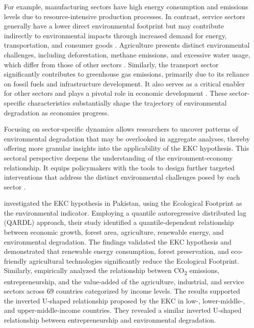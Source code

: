 \documentclass[10pt]{article}
\begin{document}
For example, manufacturing sectors have high energy consumption and emissions levels due to resource-intensive production processes. In contrast, service sectors generally have a lower direct environmental footprint but may contribute indirectly to environmental impacts through increased demand for energy, transportation, and consumer goods \citep{Madlberger2024}. Agriculture presents distinct environmental challenges, including deforestation, methane emissions, and excessive water usage, which differ from those of other sectors \citep{omotosoInterplayAgricultureGreenhouse2024}. Similarly, the transport sector significantly contributes to greenhouse gas emissions, primarily due to its reliance on fossil fuels and infrastructure development. It also serves as a critical enabler for other sectors and plays a pivotal role in economic development \citep{shafiqueInvestigatingNexusTransport2021}. These sector-specific characteristics substantially shape the trajectory of environmental degradation as economies progress.

Focusing on sector-specific dynamics allows researchers to uncover patterns of environmental degradation that may be overlooked in aggregate analyses, thereby offering more granular insights into the applicability of the EKC hypothesis. This sectoral perspective deepens the understanding of the environment-economy relationship. It equips policymakers with the tools to design further targeted interventions that address the distinct environmental challenges posed by each sector \citep{sectoralEKCandpolicy}.

\cite{azizRevisitingRoleForestry2020} investigated the EKC hypothesis in Pakistan, using the Ecological Footprint as the environmental indicator. Employing a quantile autoregressive distributed lag (QARDL) approach, their study identified a quantile-dependent relationship between economic growth, forest area, agriculture, renewable energy, and environmental degradation. The findings validated the EKC hypothesis and demonstrated that renewable energy consumption, forest preservation, and eco-friendly agricultural technologies significantly reduce the Ecological Footprint. Similarly, \cite{omriEntrepreneurshipSectoralOutputs2018} empirically analyzed the relationship between CO\textsubscript{2} emissions, entrepreneurship, and the value-added of the agriculture, industrial, and service sectors across 69 countries categorized by income levels. The results supported the inverted U-shaped relationship proposed by the EKC in low-, lower-middle-, and upper-middle-income countries. They revealed a similar inverted U-shaped relationship between entrepreneurship and environmental degradation.
\end{document}
